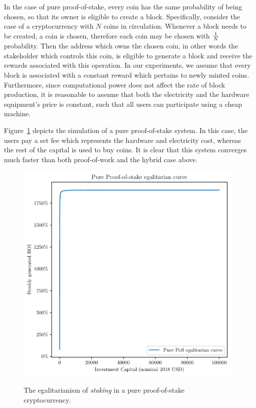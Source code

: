 In the case of pure proof-of-stake, every coin has the same probability of being chosen, so that its owner is eligible to create a block. Specifically, consider the case of a cryptocurrency with $N$ coins in circulation. Whenever a block needs to be created, a coin is chosen, therefore each coin may be chosen with $1 \over N$ probability. Then the address which owns the chosen coin, in other words the stakeholder which controls this coin, is eligible to generate a block and receive the rewards associated with this operation. In our experiments, we assume that every block is associated with a constant reward which pertains to newly minted coins. Furthermore, since computational power does not affect the rate of block production, it is reasonable to assume that both the electricity and the hardware equipment's price is constant, such that all users can participate using a cheap machine.

Figure~\ref{fig:pure-pos-stake} depicts the simulation of a pure proof-of-stake system. In this case, the users pay a set fee which represents the hardware and electricity cost, whereas the rest of the capital is used to buy coins. It is clear that this system converges much faster than both proof-of-work and the hybrid case above.

\begin{figure}[H]
    \caption{The egalitarianism of \emph{staking} in a pure proof-of-stake cryptocurrency.}
    \centering
    \includegraphics[width=0.75 \columnwidth,keepaspectratio]{figures/pure-pos.pdf}
    \label{fig:pure-pos-stake}
\end{figure}

